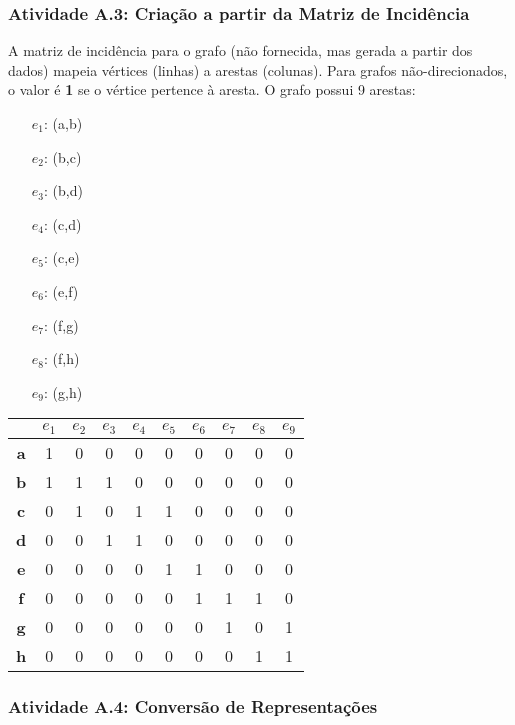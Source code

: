 \documentclass[a4paper,12pt]{article}
\begin{document}
\subsubsection*{Atividade A.3: Criação a partir da Matriz de Incidência}
A matriz de incidência para o grafo (não fornecida, mas gerada a partir dos dados) mapeia vértices (linhas) a arestas (colunas). Para grafos não-direcionados, o valor é \textbf{1} se o vértice pertence à aresta. O grafo possui 9 arestas:
\begin{multicols}{2}
\begin{itemize}[nosep, leftmargin=*]
    \item[$e_1$:] (a,b) \quad \item[$e_2$:] (b,c) \quad \item[$e_3$:] (b,d)
    \item[$e_4$:] (c,d) \quad \item[$e_5$:] (c,e) \quad \item[$e_6$:] (e,f)
    \item[$e_7$:] (f,g) \quad \item[$e_8$:] (f,h) \quad \item[$e_9$:] (g,h)
\end{itemize}
\end{multicols}
\begin{center}
\scriptsize
\begin{tabular*}{\textwidth}{c|@{\extracolsep{\fill}}ccccccccc}
\rowcolor[gray]{0.9}
 & \textbf{$e_1$} & \textbf{$e_2$} & \textbf{$e_3$} & \textbf{$e_4$} & \textbf{$e_5$} & \textbf{$e_6$} & \textbf{$e_7$} & \textbf{$e_8$} & \textbf{$e_9$} \\
\hline
\textbf{a} & 1 & 0 & 0 & 0 & 0 & 0 & 0 & 0 & 0 \\
\textbf{b} & 1 & 1 & 1 & 0 & 0 & 0 & 0 & 0 & 0 \\
\textbf{c} & 0 & 1 & 0 & 1 & 1 & 0 & 0 & 0 & 0 \\
\textbf{d} & 0 & 0 & 1 & 1 & 0 & 0 & 0 & 0 & 0 \\
\textbf{e} & 0 & 0 & 0 & 0 & 1 & 1 & 0 & 0 & 0 \\
\textbf{f} & 0 & 0 & 0 & 0 & 0 & 1 & 1 & 1 & 0 \\
\textbf{g} & 0 & 0 & 0 & 0 & 0 & 0 & 1 & 0 & 1 \\
\textbf{h} & 0 & 0 & 0 & 0 & 0 & 0 & 0 & 1 & 1 \\
\end{tabular*}
\end{center}

\subsubsection*{Atividade A.4: Conversão de Representações}
\end{document}
